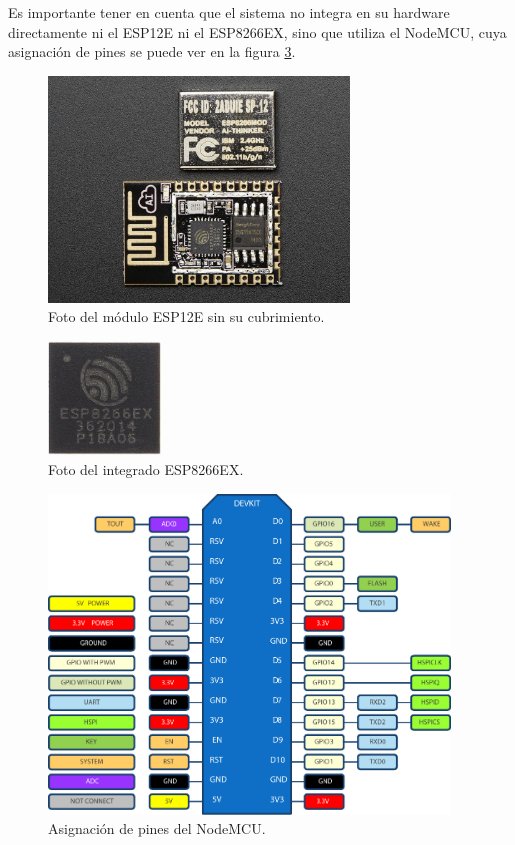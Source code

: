 Es importante tener en cuenta que el sistema no integra en su hardware directamente ni el ESP12E ni el ESP8266EX, sino que utiliza el NodeMCU, cuya asignación de pines se puede ver en la figura \ref{fig:nodemcu-pinout}.

\begin{figure}[ht!]
	\begin{center}
		\includegraphics[width=8cm]{imagenes/esp12e-foto.jpg}
		\caption{Foto del módulo ESP12E sin su cubrimiento.}
		\label{fig:foto-esp12e}
	\end{center}
\end{figure}

\begin{figure}[ht!]
	\begin{center}
		\includegraphics[width=3cm]{imagenes/esp8266ex.jpg}
		\caption{Foto del integrado ESP8266EX.}
		\label{fig:esp8266ex}
	\end{center}
\end{figure}

\begin{figure}[ht!]
	\begin{center}
		\includegraphics[width=0.95\textwidth]{imagenes/nodemcu-pinout.pdf}
		\caption{Asignación de pines del NodeMCU.}
		\label{fig:nodemcu-pinout}
	\end{center}
\end{figure}

